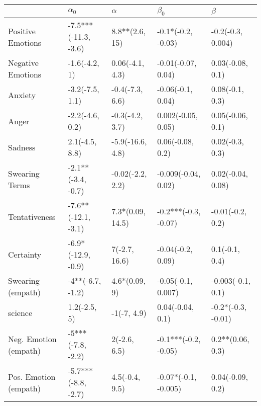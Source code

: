 \begin{tabular}{lllll}
\toprule
{} &            $\alpha_0$ &          $\alpha$ &             $\beta_0$ &             $\beta$ \\
\midrule
Positive Emotions     &  -7.5***(-11.3, -3.6) &    8.8**(2.6, 15) &    -0.1*(-0.2, -0.03) &   -0.2(-0.3, 0.004) \\
Negative Emotions     &         -1.6(-4.2, 1) &   0.06(-4.1, 4.3) &    -0.01(-0.07, 0.04) &    0.03(-0.08, 0.1) \\
Anxiety               &       -3.2(-7.5, 1.1) &   -0.4(-7.3, 6.6) &     -0.06(-0.1, 0.04) &     0.08(-0.1, 0.3) \\
Anger                 &       -2.2(-4.6, 0.2) &   -0.3(-4.2, 3.7) &    0.002(-0.05, 0.05) &    0.05(-0.06, 0.1) \\
Sadness               &        2.1(-4.5, 8.8) &  -5.9(-16.6, 4.8) &      0.06(-0.08, 0.2) &     0.02(-0.3, 0.3) \\
Swearing Terms        &    -2.1**(-3.4, -0.7) &  -0.02(-2.2, 2.2) &   -0.009(-0.04, 0.02) &   0.02(-0.04, 0.08) \\
Tentativeness         &   -7.6**(-12.1, -3.1) &  7.3*(0.09, 14.5) &  -0.2***(-0.3, -0.07) &    -0.01(-0.2, 0.2) \\
Certainty             &    -6.9*(-12.9, -0.9) &     7(-2.7, 16.6) &     -0.04(-0.2, 0.09) &      0.1(-0.1, 0.4) \\
Swearing (empath)     &      -4**(-6.7, -1.2) &     4.6*(0.09, 9) &    -0.05(-0.1, 0.007) &   -0.003(-0.1, 0.1) \\
science               &          1.2(-2.5, 5) &       -1(-7, 4.9) &      0.04(-0.04, 0.1) &  -0.2*(-0.3, -0.01) \\
Neg. Emotion (empath) &     -5***(-7.8, -2.2) &      2(-2.6, 6.5) &  -0.1***(-0.2, -0.05) &    0.2**(0.06, 0.3) \\
Pos. Emotion (empath) &   -5.7***(-8.8, -2.7) &    4.5(-0.4, 9.5) &  -0.07*(-0.1, -0.005) &    0.04(-0.09, 0.2) \\
\bottomrule
\end{tabular}
